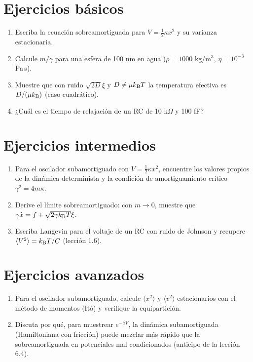\documentclass[11pt,a4paper]{article}
\begin{document}

\section{Ejercicios básicos}
\begin{enumerate}[label=\textbf{B\arabic*.}]
\item Escriba la ecuación sobreamortiguada para $V=\frac12\kappa x^2$ y su varianza estacionaria.
\item Calcule $m/\gamma$ para una esfera de 100 nm en agua ($\rho=1000$ kg/m$^3$, $\eta=10^{-3}$ Pa\,s).
\item Muestre que con ruido $\sqrt{2D}\xi$ y $D\neq\mu k_{\mathrm B} T$ la temperatura efectiva es $D/(\mu k_{\mathrm B})$ (caso cuadrático).
\item ¿Cuál es el tiempo de relajación de un RC de 10 k$\Omega$ y 100 fF?
\end{enumerate}

\section{Ejercicios intermedios}
\begin{enumerate}[label=\textbf{I\arabic*.}]
\item Para el oscilador subamortiguado con $V=\frac12\kappa x^2$, encuentre los valores propios de la dinámica determinista y la condición de amortiguamiento crítico $\gamma^2=4m\kappa$.
\item Derive el límite sobreamortiguado: con $m\to0$, muestre que $\gamma\dot x=f+\sqrt{2\gamma k_{\mathrm B} T}\xi$.
\item Escriba Langevin para el voltaje de un RC con ruido de Johnson y recupere $\langle V^2\rangle=k_{\mathrm B} T/C$ (lección 1.6).
\end{enumerate}

\section{Ejercicios avanzados}
\begin{enumerate}[label=\textbf{A\arabic*.}]
\item Para el oscilador subamortiguado, calcule $\langle x^2\rangle$ y $\langle v^2\rangle$ estacionarios con el método de momentos (Itô) y verifique la equipartición.
\item Discuta por qué, para muestrear $e^{-\beta V}$, la dinámica subamortiguada (Hamiltoniana con fricción) puede mezclar más rápido que la sobreamortiguada en potenciales mal condicionados (anticipo de la lección 6.4).
\end{enumerate}
\end{document}
